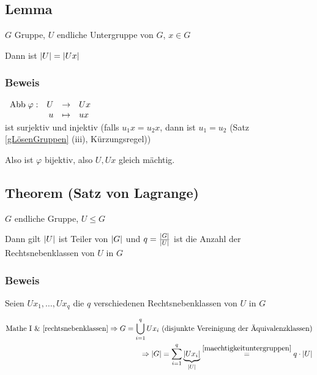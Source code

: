 
\subsection[Lemma: Mächtigkeit von Untergruppen]{Lemma}
\label{maechtigkeituntergruppen}
$G$ Gruppe, $U$ endliche Untergruppe von $G$, $x \in G$

Dann ist $\left|U\right| = \left|Ux\right|$

\subsubsection*{Beweis}

$\begin{array}[b]{rrcl}
\mathrm{ Abb } \; \varphi: 	& U &\to& Ux \\
				& u &\mapsto& ux
\end{array}$
\\ist surjektiv
und injektiv 
(falls $u_1x=u_2x$, dann ist $u_1 = u_2$ (Satz \ref{gLösenGruppen} (iii), Kürzungsregel))

Also ist $\varphi$ bijektiv, also $U, Ux$ gleich mächtig.

\subsection[Theorem: Satz von Lagrange]{Theorem (Satz von Lagrange)} \label{lagrange}

$G$ endliche Gruppe, $U \leqslant G$

Dann gilt $\left|U\right|$ ist Teiler von $\left|G\right|$ und $q = \frac{\left|G\right|}{\left|U\right|}$ ist die Anzahl der Rechtsnebenklassen von $U$ in $G$

\subsubsection*{Beweis}

Seien $Ux_1, \dots, Ux_q$ die $q$ verschiedenen Rechtsnebenklassen von $U$ in $G$

\[\begin{split}
\text{Mathe I \& \ref{rechtsnebenklassen}}\Rightarrow G = \bigcup_{i=1}^{q}Ux_i \text{ (disjunkte Vereinigung der Äquivalenzklassen)}
\\\Rightarrow \left|G\right| = \sum_{i=1}^{q}\underbrace{\left|Ux_i\right|}_{\left|U\right|} \stackrel{\ref{maechtigkeituntergruppen}}{=} q \cdot \left|U\right| \end{split}\]


